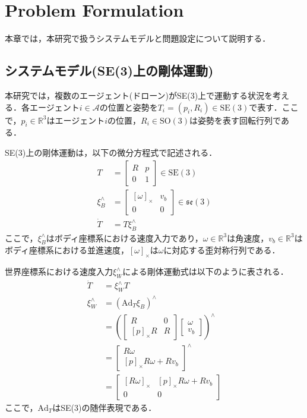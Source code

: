 \section{Problem Formulation}

本章では，本研究で扱うシステムモデルと問題設定について説明する．

\subsection{システムモデル(SE(3)上の剛体運動)}

本研究では，複数のエージェント(ドローン)がSE(3)上で運動する状況を考える．各エージェント$i \in \mathcal{A}$の位置と姿勢を$T_i = (p_i, R_i) \in \mathrm{SE}(3)$で表す．ここで，$p_i \in \mathbb{R}^3$はエージェント$i$の位置，$R_i \in \mathrm{SO}(3)$は姿勢を表す回転行列である．

SE(3)上の剛体運動は，以下の微分方程式で記述される．
\begin{equation}
\begin{aligned}
T &= \begin{bmatrix}
R & p \\
0 & 1
\end{bmatrix} \in \mathrm{SE}(3) \\
\xi^\wedge_B &= \begin{bmatrix}
[\omega]_\times & v_b \\
0 & 0
\end{bmatrix} \in \mathfrak{se}(3) \\
\dot{T} &= T \xi^\wedge_B
\label{eq:se3_dynamics}
\end{aligned}
\end{equation}
ここで，$\xi^\wedge_B$はボディ座標系における速度入力であり，$\omega \in \mathbb{R}^3$は角速度，$v_b \in \mathbb{R}^3$はボディ座標系における並進速度，$[\omega]_\times$は$\omega$に対応する歪対称行列である．

世界座標系における速度入力$\xi^\wedge_W$による剛体運動式は以下のように表される．
\begin{equation}
\begin{aligned}
\dot{T} &= \xi^\wedge_W T \\
\xi_W^\wedge &= (\mathrm{Ad}_T \xi_B)^\wedge \\
&= \left( \begin{bmatrix}
R & 0 \\
[p]_\times R & R
\end{bmatrix}
\begin{bmatrix}
\omega \\
v_b
\end{bmatrix} \right)^\wedge \\
&= \begin{bmatrix}
R\omega \\
[p]_\times R\omega + Rv_b
\end{bmatrix}^\wedge \\
&= \begin{bmatrix}
[R\omega]_\times & [p]_\times R\omega + Rv_b \\
0 & 0
\end{bmatrix}
\label{eq:se3_dynamics_world}
\end{aligned}
\end{equation}
ここで，$\mathrm{Ad}_T$はSE(3)の随伴表現である．

